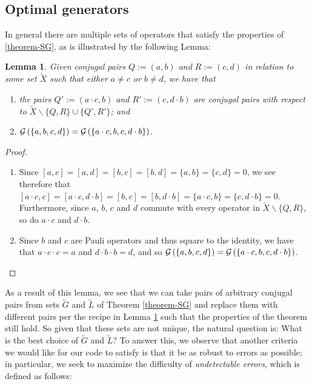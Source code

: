 \documentclass[twocolumn,showpacs,preprintnumbers,amsmath,amssymb,nofootinbib,pra,floatfix]{revtex4-1}
\newtheorem{lemma}{Lemma}
\newcommand{\set}{\tilde}
\newcommand{\genfun}{\mathcal{G}}
\begin{document}
\subsection{Optimal generators}

\label{optimal-generators}

In general there are multiple sets of operators that satisfy the properties of \ref{theorem-SG}, as is illustrated by the following Lemma:

\begin{lemma}
\label{combining-pairs}
Given conjugal pairs $Q:=(a,b)$ and $R:=(c,d)$ in relation to some set $\set X$ such that either $a\ne c$ or $b\ne d$, we have that
\begin{enumerate}
\item the pairs $Q':=(a\cdot c,b)$ and $R':=(c,d\cdot b)$ are conjugal pairs with respect to $\set X \backslash \{Q,R\} \cup \{Q',R'\}$; and
\item $\genfun\paren{\{a,b,c,d\}}=\genfun\paren{\{a\cdot c,b,c,d\cdot b\}}$.
\end{enumerate}
\end{lemma}

\begin{proof}
\begin{enumerate}
\item Since $[a,c]=[a,d]=[b,c]=[b,d]=\{a,b\}=\{c,d\}=0$, we see therefore that $[a\cdot c,c]=[a\cdot c,d\cdot b]=[b,c]=[b,d\cdot b]=\{a\cdot c,b\}=\{c,d\cdot b\}=0$.  Furthermore, since $a$, $b$, $c$ and $d$ commute with every operator in $\set X\backslash \{Q,R\}$, so do $a\cdot c$ and $d\cdot b$.
\item Since $b$ and $c$ are Pauli operators and thus square to the identity, we have that $a\cdot c\cdot c=a$ and $d\cdot b\cdot b=d$, and so $\genfun\paren{\{a,b,c,d\}}=\genfun\paren{\{a\cdot c,b,c,d\cdot b\}}$.
\end{enumerate}
\end{proof}
As a result of this lemma, we see that we can take pairs of arbitrary conjugal pairs from sets $\set G$ and $\set L$ of Theorem \ref{theorem-SG} and replace them with different pairs per the recipe in Lemma \ref{combining-pairs} such that the properties of the theorem still hold.  So given that these sets are not unique, the natural question is:  What is the best choice of $\set G$ and $\set L$?  To answer this, we observe that another criteria we would like for our code to satisfy is that it be as robust to errors as possible;  in particular, we seek to maximize the difficulty of \emph{undetectable errors}, which is defined as follows:
\end{document}
